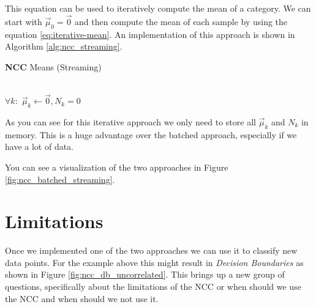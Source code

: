 This equation can be used to iteratively compute the mean of a category. We can start with $\vec{\mu}_0 = \vec{0}$ and then compute the mean of each sample by using the equation \eqref{eq:iterative-mean}.
An implementation of this approach is shown in Algorithm \ref{alg:ncc_streaming}.
\begin{algorithm}
\LinesNumbered
\caption{\textbf{NCC} Means (Streaming)}\label{alg:ncc_streaming}
\\
$\forall k:$ $\vec{\mu}_k \gets \vec{0}, N_k = 0$\;
\end{algorithm}
As you can see for this iterative approach we only need to store all $\vec{\mu}_k$ and $N_k$ in memory. This is a huge advantage over the batched approach, especially if we have a lot of data.

You can see a visualization of the two approaches in Figure \ref{fig:ncc_batched_streaming}.

\section{Limitations}
Once we implemented one of the two approaches we can use it to classify new data points. For the example above this might result in \textit{Decision Boundaries} as shown in Figure \ref{fig:ncc_db_uncorrelated}.
This brings up a new group of questions, specifically about the limitations of the NCC or when 
should we use the NCC and when should we not use it.


